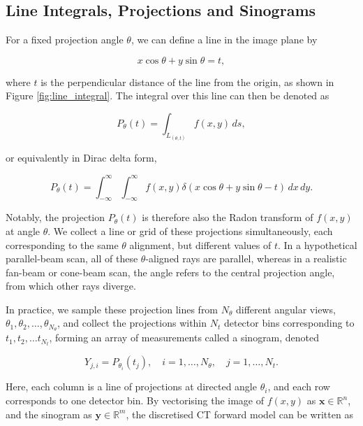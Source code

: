 \subsection{Line Integrals, Projections and Sinograms}
\label{subsec:line_integrals_projections_sinograms}

For a fixed projection angle $\theta$, we can define a line in the image plane by

\begin{equation}
x\cos \theta + y\sin \theta=t,
\label{eq:line_t}
\end{equation}

where $t$ is the perpendicular distance of the line from the origin, as shown in Figure \ref{fig:line_integral}. The integral over this line can then be denoted as

\begin{equation}
P_\theta(t) = \int_{L_{(\theta,t)}} f(x,y) \, ds,
\label{eq:projection_line_integral}
\end{equation}

or equivalently in Dirac delta form,

\begin{equation}
P_\theta(t)=\int_{-\infty}^\infty \int_{-\infty}^\infty  f(x,y)\delta(x\cos \theta+ y\sin \theta-t) \, dx\, dy.
\label{eq:radon_delta_form}
\end{equation}

Notably, the projection $P_\theta(t)$ is therefore also the Radon transform \cite{radon} of $f(x,y)$ at angle $\theta$. We collect a line or grid of these projections simultaneously, each corresponding to the same $\theta$ alignment, but different values of $t$. In a hypothetical parallel-beam scan, all of these $\theta$-aligned rays are parallel, whereas in a realistic fan-beam or cone-beam scan, the angle refers to the central projection angle, from which other rays diverge.

In practice, we sample these projection lines from $N_\theta$ different angular views, $\theta_1, \theta_2, \dots, \theta_{N_\theta}$, and collect the projections within $N_t$ detector bins corresponding to $t_1, t_2, \dots t_{N_t}$, forming an array of measurements called a sinogram, denoted

\begin{equation}
Y_{j,i}=P_{\theta_i}(t_j), \quad i=1,\dots, N_\theta, \quad j=1,\dots, N_t.
\label{eq:sinogram_entries}
\end{equation}

Here, each column is a line of projections at directed angle $\theta_i$, and each row corresponds to one detector bin. By vectorising the image of $f(x,y)$ as $\mathbf{x}\in \mathbb{R}^n$, and the sinogram as $\mathbf{y}\in \mathbb{R}^m$, the discretised CT forward model can be written as

